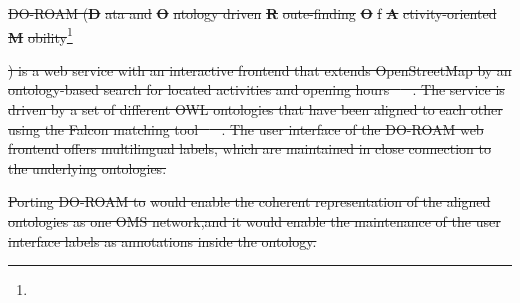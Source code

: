 \documentclass[10pt,fleqn,final]{scrreprt}
\newcommand*{\DOL}{\ensuremath{\mathsf{DOL}}\xspace}
\newcommand{\sclause}[1]{\section{#1}}
\providecommand{\DIFdel}[1]{{\protect\color{red}\sout{#1}}}                      %
\begin{document}
\DIFdel{DO-ROAM (}\textbf{\DIFdel{D}}%
\DIFdel{ata and }\textbf{\DIFdel{O}}%
\DIFdel{ntology driven }\textbf{\DIFdel{R}}%
\DIFdel{oute-finding }\textbf{\DIFdel{O}}%
\DIFdel{f }\textbf{\DIFdel{A}}%
\DIFdel{ctivity-oriented }\textbf{\DIFdel{M}}%
\DIFdel{obility}\footnote{%
}%
\addtocounter{footnote}{-1}%
\DIFdel{) is a web service with an interactive frontend that extends OpenStreetMap by an ontology-based search for located activities and opening hours \mbox{%
\cite{do-roam}
}%
. The service is driven by a set of different OWL ontologies that have been aligned to each other using the Falcon matching tool \mbox{%
\cite{HuQu-08}
}%
.  The user interface of the DO-ROAM web frontend offers multilingual labels, which are maintained in close connection to the underlying ontologies. }%

\DIFdel{Porting DO-ROAM to }%
\DIFdel{would enable the coherent representation of the aligned ontologies as one OMS network,and it would enable  the maintenance of the user interface labels as annotations inside the ontology. }%
\end{document}
